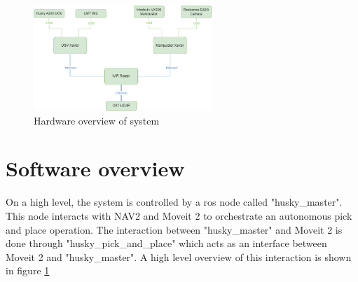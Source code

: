 \begin{figure}[H]
  \centering
  \includegraphics[width = 0.6\textwidth]{Figures/example_figure.drawio.png}
  \caption{Hardware overview of system}
  \label{fig:hardware_overview}
\end{figure}


\section{Software overview}
On a high level, the system is controlled by a ros node called "husky\_master". This node interacts with NAV2 and Moveit 2 to orchestrate an autonomous pick and place operation. The interaction between "husky\_master" and Moveit 2 is done through "husky\_pick\_and\_place" which acts as an interface between Moveit 2 and "husky\_master". A high level overview of this interaction is shown in figure \ref{}


